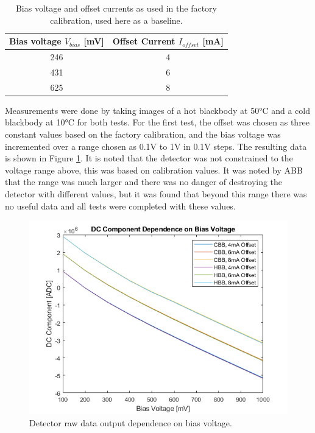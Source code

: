 \begin{table}[h]
\begin{center}
\begin{tabular}{ |c|c| } 
 \hline
 \rowcolor{lightgray}
 Bias voltage $V_{bias}$ [mV] &  Offset Current $I_{offset}$ [mA]\\ 
 \hline
  246 & 4 \\ 
  \hline
 431 & 6  \\
 \hline
 625 & 8 \\
 \hline
 \end{tabular}
\end{center}
\caption{Bias voltage and offset currents as used in the factory calibration, used here as a baseline.}
\label{vbias_ioffset_table}
\end{table}

Measurements were done by taking images of a hot blackbody at 50°C and a cold blackbody at 10°C for both tests. For the first test, the offset was chosen as three constant values based on the factory calibration, and the bias voltage was incremented over a range chosen as 0.1V to 1V in 0.1V steps. The resulting data is shown in Figure \ref{fig:dc_dep_on_bias}. It is noted that the detector was not constrained to the voltage range above, this was based on calibration values. It was noted by ABB that the range was much larger and there was no danger of destroying the detector with different values, but it was found that beyond this range there was no useful data and all tests were completed with these values.

\begin{figure}[h]
  \centering
  \includegraphics[width=0.9\linewidth]{chap6_images/verification/dc_component_dependence_on_bias_voltage.png}
  \caption{Detector raw data output dependence on bias voltage.}
  \label{fig:dc_dep_on_bias}
\end{figure}

